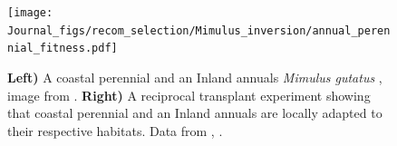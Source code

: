 \begin{figure} %
\begin{center}
\texttt{[image: Journal\_figs/recom\_selection/Mimulus\_inversion/annual\_perennial\_fitness.pdf]}
\end{center}
\caption{{\bf Left)} A coastal perennial and an Inland annuals {\it Mimulus gutatus} \citet{lowry2010widespread}, image from \citet{lowry2010widespread} \PLOSccBY. {\bf Right)} A reciprocal transplant experiment showing that coastal perennial and an Inland annuals are locally adapted to their respective habitats. Data from  \citet{lowry2010widespread}, . 
}\label{fig:annual_perennial_fitness}
\end{figure}


